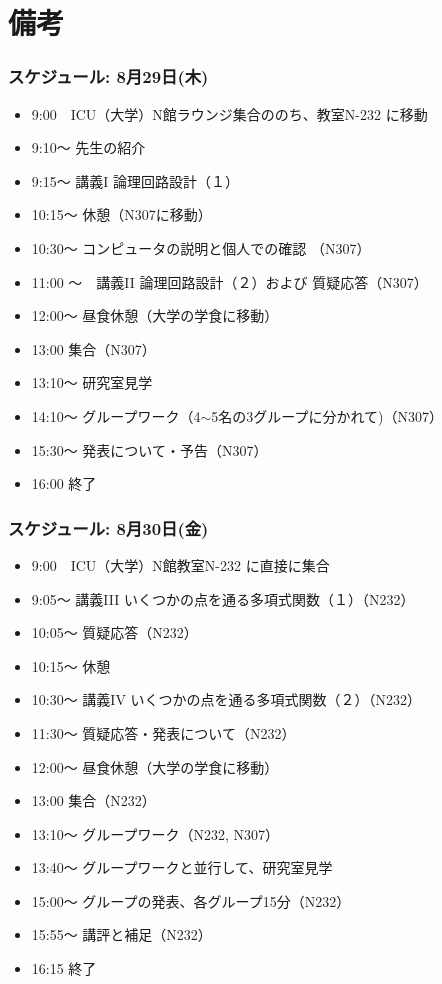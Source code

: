 \documentclass[10pt, dvipdfmx]{beamer}
\begin{document}
\section{備考}
\begin{frame}
\frametitle{スケジュール: 8月29日(木)}
\begin{itemize}
\item 9:00　ICU（大学）N館ラウンジ集合ののち、教室N-232 に移動
\item 9:10〜 先生の紹介
\item 9:15〜 講義I 論理回路設計（１）
\item 10:15〜 休憩（N307に移動）
\item 10:30〜 コンピュータの説明と個人での確認 （N307）
\item 11:00 〜　講義II 論理回路設計（２）および 質疑応答（N307）
\item 12:00〜 昼食休憩（大学の学食に移動） 
\item 13:00 集合（N307） 
\item 13:10〜 研究室見学 
\item 14:10〜 グループワーク（4$\sim$5名の3グループに分かれて)（N307） 
\item 15:30〜 発表について・予告（N307） 
\item 16:00 終了 
\end{itemize}
\end{frame}
\begin{frame}
\frametitle{スケジュール: 8月30日(金)}
\begin{itemize}
\item 9:00　ICU（大学）N館教室N-232 に直接に集合 
\item 9:05〜 講義III いくつかの点を通る多項式関数（１）（N232） 
\item 10:05〜 質疑応答（N232） 
\item 10:15〜 休憩 
\item 10:30〜 講義IV いくつかの点を通る多項式関数（２）（N232） 
\item 11:30〜 質疑応答・発表について（N232） 
\item 12:00〜 昼食休憩（大学の学食に移動） 
\item 13:00 集合（N232） 
\item 13:10〜 グループワーク（N232, N307） 
\item 13:40〜 グループワークと並行して、研究室見学　 
\item 15:00〜 グループの発表、各グループ15分（N232） 
\item 15:55〜 講評と補足（N232） 
\item 16:15 終了 
\end{itemize}
\end{frame}
\end{document}
